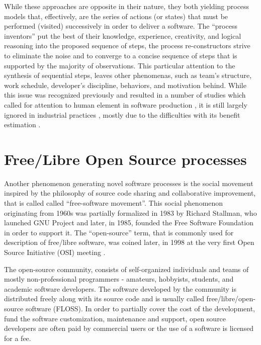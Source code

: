 While these approaches are opposite in their nature, they both yielding process models that, effectively,
are the series of actions (or states) that must be performed (visited) successively in order to deliver a 
software. The ``process inventors'' put the best of their knowledge, experience, creativity, and logical 
reasoning into the proposed sequence of steps, the process re-constructors 
strive to eliminate the noise and to converge to a concise sequence of steps that is supported by the 
majority of observations. 
This particular attention to the synthesis of sequential steps, leaves other phenomenas, 
such as team's structure, work schedule, developer's discipline, behaviors, and motivation behind. 
While this issue was recognized previously and resulted in a number of studies which called for attention 
to human element in software production \cite{citeulike:149387} \cite{citeulike:113403} 
\cite{citeulike:205322} \cite{citeulike:12798652}, 
it is still largely ignored in industrial practices \cite{citeulike:12798659}, mostly due to the 
difficulties with its benefit estimation \cite{citeulike:12798662} \cite{csdl2-12-11}.

%
%
\section{Free/Libre Open Source processes}\label{floss_processes}
Another phenomenon generating novel software processes is the social movement inspired by the philosophy 
of source code sharing and collaborative improvement, that is called called ``free-software movement''. 
This social phenomenon originating from 1960s was partially formalized in 1983 by Richard Stallman,
who launched GNU Project and later, in 1985, founded the Free Software Foundation in order to support 
it. The ``open-source'' term, that is commonly used for description of free/libre software, 
was coined later, in 1998 at the very first Open Source Initiative (OSI) meeting \cite{osi-history}.

The open-source community, consists of self-organized individuals and teams of mostly non-professional 
programmers - amateurs, hobbyists, students, and academic software developers. The software 
developed by the community is distributed freely along with its source code and is usually called 
free/libre/open-source software (FLOSS). 
In order to partially cover the cost of the development, fund the software customization, maintenance 
and support, open source developers are often paid by commercial users or the use of a software is 
licensed for a fee.

